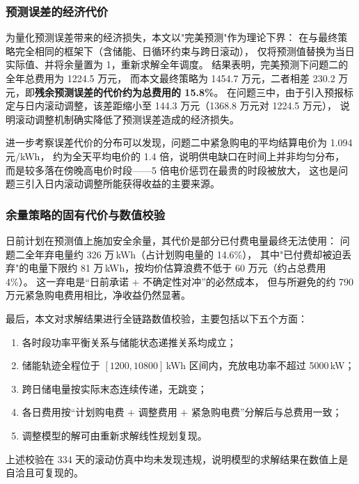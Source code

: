 \subsubsection{预测误差的经济代价}
为量化预测误差带来的经济损失，本文以"完美预测"作为理论下界：
在与最终策略完全相同的框架下（含储能、日循环约束与跨日滚动），
仅将预测值替换为当日实际值、并将余量置为 1，重新求解全年调度。
结果表明，完美预测下问题二的全年总费用为 1224.5 万元，
而本文最终策略为 1454.7 万元，二者相差 230.2 万元，即\textbf{残余预测误差的代价约为总费用的 15.8\%}。
在问题三中，由于引入预报标定与日内滚动调整，该差距缩小至 144.3 万元（1368.8 万元对 1224.5 万元），
说明滚动调整机制确实降低了预测误差造成的经济损失。

进一步考察误差代价的分布可以发现，问题二中紧急购电的平均结算电价为 1.094 元/kWh，
约为全天平均电价的 1.4 倍，说明供电缺口在时间上并非均匀分布，
而是较多落在傍晚高电价时段——5 倍电价惩罚在最贵的时段被放大，
这也是问题三引入日内滚动调整所能获得收益的主要来源。

\subsubsection{余量策略的固有代价与数值校验}
日前计划在预测值上施加安全余量，其代价是部分已付费电量最终无法使用：
问题二全年弃电量约 326 万\,kWh（占计划购电量的 14.6\%），
其中"已付费却被迫丢弃"的电量下限约 81 万\,kWh，按均价估算浪费不低于 60 万元（约占总费用 4\%）。
这一弃电是“日前承诺 $+$ 不确定性对冲”的必然成本，
但与所避免的约 790 万元紧急购电费用相比，净收益仍然显著。

最后，本文对求解结果进行全链路数值校验，主要包括以下五个方面：
\begin{enumerate}[label=(\arabic*), leftmargin=2.5em, itemsep=0.3em]
\item 各时段功率平衡关系与储能状态递推关系均成立；
\item 储能轨迹全程位于 $[1200,10800]$\,kWh 区间内，充放电功率不超过 5000\,kW；
\item 跨日储电量按实际末态连续传递，无跳变；
\item 各日费用按“计划购电费 $+$ 调整费用 $+$ 紧急购电费”分解后与总费用一致；
\item 调整模型的解可由重新求解线性规划复现。
\end{enumerate}
上述校验在 334 天的滚动仿真中均未发现违规，说明模型的求解结果在数值上是自洽且可复现的。

